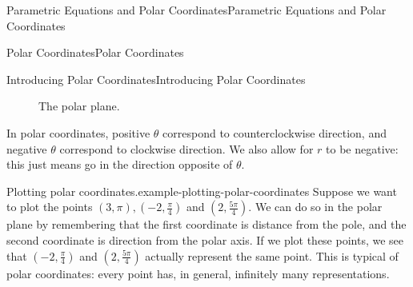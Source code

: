 \documentclass[10pt,]{book}
\numberwithin{equation}{section}
\begin{document}
\begin{chapterptx}{Parametric Equations and Polar Coordinates}{}{Parametric Equations and Polar Coordinates}{}{}
\begin{sectionptx}{Polar Coordinates}{}{Polar Coordinates}{}{}
\begin{subsectionptx}{Introducing Polar Coordinates}{}{Introducing Polar Coordinates}{}{}
\begin{figure}
{\begin{tikzpicture}[scale=.6]
            \end{tikzpicture}
}
\caption{The polar plane.\label{figure-polar-plane}}
\end{figure}
\hypertarget{p-800}{}%
In polar coordinates, positive \(\theta\) correspond to counterclockwise direction, and negative \(\theta\) correspond to clockwise direction. We also allow for \(r\) to be negative: this just means go in the direction opposite of \(\theta\).%
\begin{example}{Plotting polar coordinates.}{example-plotting-polar-coordinates}%
\hypertarget{p-801}{}%
Suppose we want to plot the points \((3,\pi), (-2,\frac{\pi}{4})\) and \((2,\frac{5\pi}{4}).\) We can do so in the polar plane by remembering that the first coordinate is distance from the pole, and the second coordinate is direction from the polar axis. If we plot these points, we see that \((-2,\frac{\pi}{4})\) and \((2,\frac{5\pi}{4})\) actually represent the same point. This is typical of polar coordinates: every point has, in general, infinitely many representations.%
\end{example}
\begin{figure}
\centering
{
        }
\end{figure}
\end{subsectionptx}
\end{sectionptx}
\end{chapterptx}
\end{document}
